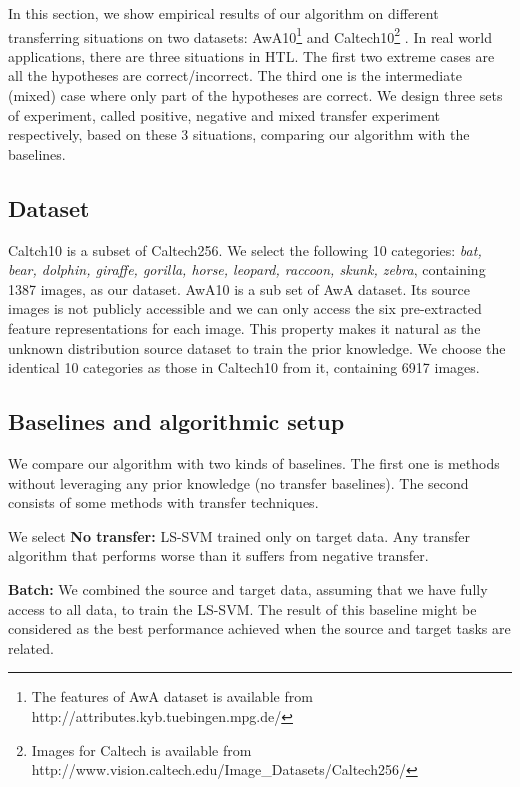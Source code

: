 In this section, we show empirical results of our algorithm on different transferring situations on two datasets: AwA10\footnote{The features of AwA dataset is available from http://attributes.kyb.tuebingen.mpg.de/} \cite{lampert2009learning} and Caltech10\footnote{Images for Caltech is available from http://www.vision.caltech.edu/Image\_Datasets/Caltech256/} \cite{griffin2007caltech}. In real world applications, there are three situations in HTL. The first two extreme cases are all the hypotheses are correct/incorrect. The third one is the intermediate (mixed) case where only part of the hypotheses are correct. We design three sets of experiment, called positive, negative and mixed transfer experiment respectively, based on these 3 situations, comparing our algorithm with the baselines.
\subsection{Dataset}
Caltch10 is a subset of Caltech256. We select the following 10 categories: \textit{bat, bear, dolphin, giraffe, gorilla, horse, leopard, raccoon, skunk, zebra}, containing 1387 images, as our dataset.
AwA10 is a sub set of AwA dataset. Its source images is not publicly accessible and we can only access the six pre-extracted feature representations for each image. This property makes it natural as the unknown distribution source dataset to train the prior knowledge. We choose the identical 10 categories as those in Caltech10 from it, containing 6917 images.

\subsection{Baselines and algorithmic setup}
We compare our algorithm with two kinds of baselines. The first one is methods without leveraging any prior knowledge (no transfer baselines). The second consists of some methods with transfer techniques. 

We select
\textbf{No transfer:} LS-SVM trained only on target data. Any transfer algorithm that performs worse than it suffers from negative transfer.

\textbf{Batch:} We combined the source and target data, assuming that we have fully access to all data, to train the LS-SVM. The result of this baseline might be considered as the best performance achieved when the source and target tasks are related. %

